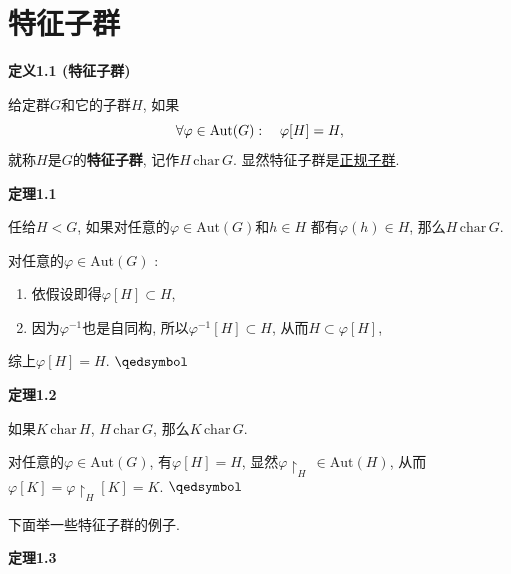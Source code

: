 \documentclass[UTF8]{ctexart}
\begin{document}
\setlength{\abovedisplayskip}{1pt}
\setlength{\belowdisplayskip}{1pt}

\section{特征子群}

\hypertarget{sec:定义1.1}{}
\noindent\textbf{定义1.1 (特征子群)}

给定群$G$和它的子群$H$, 如果
\vspace{-3pt}
\[
    \forall\varphi\in\mathrm{Aut}(G):\quad\varphi[H]=H,\\[-3pt]
\]
就称$H$是$G$的\textbf{特征子群}, 记作$H\,\mathrm{char}\,G$.
显然特征子群是\href{05 正规子群与商群#nameddest=sec:定义1.1}{正规子群}.

\vspace{10pt}

\hypertarget{sec:定理1.1}{}
\noindent\textbf{定理1.1}

任给$H<G$, 如果对任意的$\varphi\in\mathrm{Aut}(G)$和$h\in H$
都有$\varphi(h)\in H$, 那么$H\,\mathrm{char}\,G$.


对任意的$\varphi\in\mathrm{Aut}(G)$ :
\begin{enumerate}
    \item 依假设即得$\varphi[H]\subset H$,
    \item 因为$\varphi^{-1}$也是自同构, 所以$\varphi^{-1}[H]\subset H$,
    从而$H\subset\varphi[H]$,
\end{enumerate}
综上$\varphi[H]=H$. \hfill $\qedsymbol$

\vspace{10pt}

\hypertarget{sec:定理1.2}{}
\noindent\textbf{定理1.2}

如果$K\,\mathrm{char}\,H$, $H\,\mathrm{char}\,G$, 那么$K\,\mathrm{char}\,G$.


对任意的$\varphi\in\mathrm{Aut}(G)$, 有$\varphi[H]=H$,
显然$\varphi\!\restriction_{H}\,\in\mathrm{Aut}(H)$, 从而
$\varphi[K]=\varphi\!\restriction_{H}[K]=K$. \hfill $\qedsymbol$

\vspace{15pt}

下面举一些特征子群的例子.

\vspace{10pt}

\hypertarget{sec:定理1.3}{}
\noindent\textbf{定理1.3}
\end{document}

